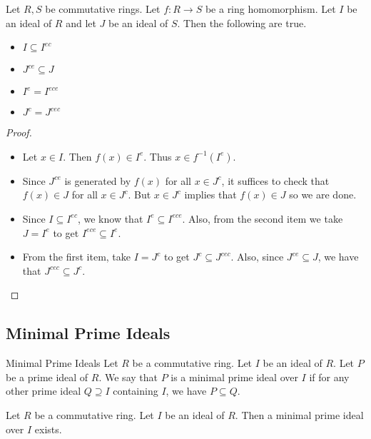 \documentclass[a4paper]{article}
\begin{document}
\begin{prp}{}{} Let $R,S$ be commutative rings. Let $f:R\to S$ be a ring homomorphism. Let $I$ be an ideal of $R$ and let $J$ be an ideal of $S$. Then the following are true. 
\begin{itemize}
\item $I\subseteq I^{ec}$
\item $J^{ce}\subseteq J$
\item $I^e=I^{ece}$
\item $J^c=J^{cec}$
\end{itemize} \tcbline
\begin{proof}~\\
\begin{itemize}
\item Let $x\in I$. Then $f(x)\in I^e$. Thus $x\in f^{-1}(I^e)$. 
\item Since $J^{ce}$ is generated by $f(x)$ for all $x\in J^c$, it suffices to check that $f(x)\in J$ for all $x\in J^c$. But $x\in J^c$ implies that $f(x)\in J$ so we are done. 
\item Since $I\subseteq I^{ec}$, we know that $I^e\subseteq I^{ece}$. Also, from the second item we take $J=I^e$ to get $I^{ece}\subseteq I^e$. 
\item From the first item, take $I=J^c$ to get $J^c\subseteq J^{cec}$. Also, since $J^{ce}\subseteq J$, we have that $J^{cec}\subseteq J^c$. 
\end{itemize}
\end{proof}
\end{prp}

\subsection{Minimal Prime Ideals}
\begin{defn}{Minimal Prime Ideals}{} Let $R$ be a commutative ring. Let $I$ be an ideal of $R$. Let $P$ be a prime ideal of $R$. We say that $P$ is a minimal prime ideal over $I$ if for any other prime ideal $Q\supseteq I$ containing $I$, we have $P\subseteq Q$. 
\end{defn}

\begin{prp}{}{} Let $R$ be a commutative ring. Let $I$ be an ideal of $R$. Then a minimal prime ideal over $I$ exists. 
\end{prp}
\end{document}
